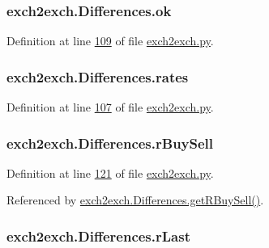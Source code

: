 \subsubsection[{\texorpdfstring{ok}{ok}}]{\setlength{\rightskip}{0pt plus 5cm}exch2exch.\+Differences.\+ok}\hypertarget{classexch2exch_1_1_differences_a6de3ee563584c83a97ba815db8ec7831}{}\label{classexch2exch_1_1_differences_a6de3ee563584c83a97ba815db8ec7831}


Definition at line \hyperlink{exch2exch_8py_source_l00109}{109} of file \hyperlink{exch2exch_8py_source}{exch2exch.\+py}.

\subsubsection[{\texorpdfstring{rates}{rates}}]{\setlength{\rightskip}{0pt plus 5cm}exch2exch.\+Differences.\+rates}\hypertarget{classexch2exch_1_1_differences_a64aec2fc7f20028f0bd834908cbea116}{}\label{classexch2exch_1_1_differences_a64aec2fc7f20028f0bd834908cbea116}


Definition at line \hyperlink{exch2exch_8py_source_l00107}{107} of file \hyperlink{exch2exch_8py_source}{exch2exch.\+py}.

\subsubsection[{\texorpdfstring{r\+Buy\+Sell}{rBuySell}}]{\setlength{\rightskip}{0pt plus 5cm}exch2exch.\+Differences.\+r\+Buy\+Sell}\hypertarget{classexch2exch_1_1_differences_a3cbdf344e8e0b804c611e6b9e3a3d1bd}{}\label{classexch2exch_1_1_differences_a3cbdf344e8e0b804c611e6b9e3a3d1bd}


Definition at line \hyperlink{exch2exch_8py_source_l00121}{121} of file \hyperlink{exch2exch_8py_source}{exch2exch.\+py}.



Referenced by \hyperlink{exch2exch_8py_source_l00141}{exch2exch.\+Differences.\+get\+R\+Buy\+Sell()}.

\subsubsection[{\texorpdfstring{r\+Last}{rLast}}]{\setlength{\rightskip}{0pt plus 5cm}exch2exch.\+Differences.\+r\+Last}\hypertarget{classexch2exch_1_1_differences_a3c26c51929ce75e055f8a606aaeb849d}{}\label{classexch2exch_1_1_differences_a3c26c51929ce75e055f8a606aaeb849d}


